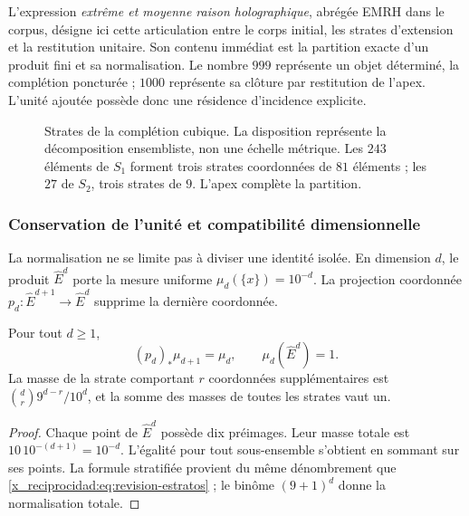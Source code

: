 L'expression \emph{extrême et moyenne raison holographique}, abrégée EMRH dans
le corpus, désigne ici cette articulation entre le corps initial, les
strates d'extension et la restitution unitaire. Son contenu immédiat
est la partition exacte d'un produit fini et sa normalisation. Le nombre
\(999\) représente un objet déterminé, la complétion poncturée ;
\(1000\) représente sa clôture par restitution de l'apex. L'unité
ajoutée possède donc une résidence d'incidence explicite.

\begin{figure}[htbp]
\centering
{}
\caption{Strates de la complétion cubique. La disposition représente
la décomposition ensembliste, non une échelle métrique. Les \(243\) éléments
de \(S_1\) forment trois strates coordonnées de \(81\) éléments ; les \(27\)
de \(S_2\), trois strates de \(9\). L'apex complète la partition.}
\label{x_reciprocidad:fig:revision-emrh}
\end{figure}

\subsubsection{Conservation de l'unité et compatibilité dimensionnelle}

La normalisation ne se limite pas à diviser une identité isolée. En dimension
\(d\), le produit \(\widehat E^d\) porte la mesure uniforme
\(\mu_d(\{x\})=10^{-d}\). La projection coordonnée
\(p_d:\widehat E^{d+1}\to\widehat E^d\) supprime la dernière coordonnée.

\begin{proposition}
Pour tout \(d\geq1\),
\[
 (p_d)_*\mu_{d+1}=\mu_d,
 \qquad \mu_d(\widehat E^d)=1.
\]
La masse de la strate comportant \(r\) coordonnées supplémentaires est
\(\binom dr9^{d-r}/10^d\), et la somme des masses de toutes les strates
vaut un.
\end{proposition}
\begin{proof}
Chaque point de \(\widehat E^d\) possède dix préimages. Leur masse totale est
\(10\,10^{-(d+1)}=10^{-d}\). L'égalité pour tout sous-ensemble
s'obtient en sommant sur ses points. La formule stratifiée provient
du même dénombrement que \eqref{x_reciprocidad:eq:revision-estratos} ; le binôme
\((9+1)^d\) donne la normalisation totale.
\end{proof}


